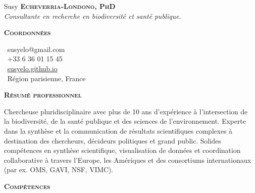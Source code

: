\documentclass[10pt, a4paper]{article}
\newcommand{\headleft}[1]{\vspace*{3ex}\textsc{\textbf{#1}}\par%
    \vspace*{-1.5ex}\hrulefill\par\vspace*{0.7ex}}
\begin{document}
\setlength{\topskip}{0pt}
\setlength{\parindent}{0pt}
\setlength{\parskip}{0pt}
\setlength{\fboxsep}{0pt}
\pagestyle{empty}
\raggedbottom

\begin{minipage}[t]{0.33\textwidth} %
\colorbox{cvblue}{\begin{minipage}[t][5mm][t]{\textwidth}\null\hfill\null\end{minipage}}

\vspace{-.2ex} %
\colorbox{cvblue!90}{\color{white}  %
\textwidth\relax%
\begin{minipage}[t][293mm][t]{0.82\textwidth}
\raggedright
\vspace*{2.5ex}

\Large Susy \textbf{\textsc{Echeverria-Londono, PhD}} \normalsize \\
\emph{Consultante en recherche en biodiversité et santé publique. }


\headleft{Coordonnées}
\small %
\MVAt\ {\small susyelo@gmail.com} \\[0.4ex]
\Mobilefone\ +33 6 36 01 15 45 \\[0.5ex]
\Mundus\ \href{https://susyelo.github.io/}{susyelo.github.io} \\[0.1ex]
\Letter\ Région parisienne, France
\normalsize

\headleft{Résumé professionnel}
\small Chercheuse pluridisciplinaire avec plus de 10 ans d’expérience à l’intersection de la biodiversité, de la santé publique et des sciences de l’environnement. Experte dans la synthèse et la communication de résultats scientifiques complexes à destination des chercheurs, décideurs politiques et grand public. Solides compétences en synthèse scientifique, visualisation de données et coordination collaborative à travers l’Europe, les Amériques et des consortiums internationaux (par ex. OMS, GAVI, NSF, VIMC).


\headleft{Compétences}
\normalsize

\begin{itemize}


\end{itemize}
\end{minipage}}
\end{minipage}
\end{document}
